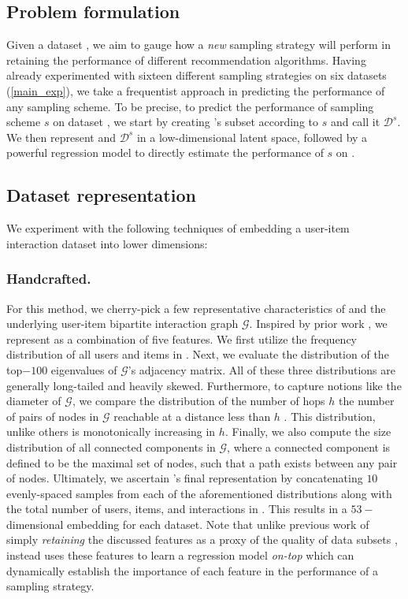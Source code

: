 \subsection{Problem formulation}
Given a dataset \dataset, we aim to gauge how a \emph{new} sampling strategy will perform in retaining the performance of different recommendation algorithms. Having already experimented with sixteen different sampling strategies on six datasets (\cref{main_exp}), we take a frequentist approach in predicting the performance of any sampling scheme. To be precise, to predict the performance of sampling scheme $s$ on dataset \dataset, we start by creating \dataset's subset according to $s$ and call it $\mathcal{D}^s$. We then represent \dataset and $\mathcal{D}^s$ in a low-dimensional latent space, followed by a powerful regression model to directly estimate the performance of $s$ on \dataset.

\subsection{Dataset representation} \label{data_rep}
We experiment with the following techniques of embedding a user-item interaction dataset into lower dimensions:

\subsubsection{Handcrafted. \ \ } For this method, we cherry-pick a few representative characteristics of \dataset and the underlying user-item bipartite interaction graph $\mathcal{G}$. Inspired by prior work \cite{large_graphs}, we represent \dataset as a combination of five features. We first utilize the frequency distribution of all users and items in \dataset. Next, we evaluate the distribution of the top$-100$ eigenvalues of $\mathcal{G}$'s adjacency matrix. All of these three distributions are generally long-tailed and heavily skewed. Furthermore, to capture notions like the diameter of $\mathcal{G}$, we compare the distribution of the number of hops $h$ \vs the number of pairs of nodes in $\mathcal{G}$ reachable at a distance less than $h$ \cite{hop_plot}. This distribution, unlike others is monotonically increasing in $h$. Finally, we also compute the size distribution of all connected components in $\mathcal{G}$, where a connected component is defined to be the maximal set of nodes, such that a path exists between any pair of nodes. Ultimately, we ascertain \dataset's final representation by concatenating $10$ evenly-spaced samples from each of the aforementioned distributions along with the total number of users, items, and interactions in \dataset. This results in a $53-$dimensional embedding for each dataset. Note that unlike previous work of simply \emph{retaining} the discussed features as a proxy of the quality of data subsets \cite{large_graphs}, \oracle instead uses these features to learn a regression model \emph{on-top} which can dynamically establish the importance of each feature in the performance of a sampling strategy.


